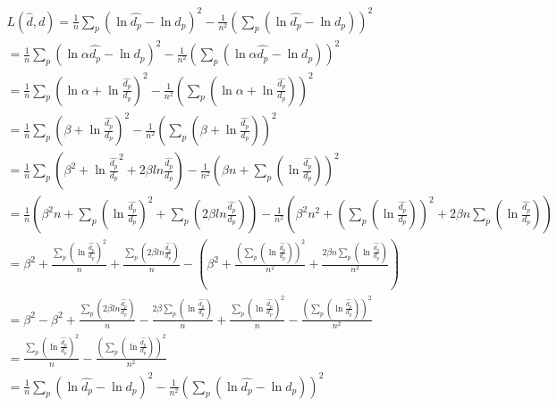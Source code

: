 \label{demostracion}


\begin{align*}
    L(\hat{d}, d) = \frac{1}{n}\sum_{p} (\ln{\hat{d_p}} - \ln{d_p})^2 - \frac{1}{n^2} \left( \sum_{p} (\ln{\hat{d_p}} - \ln{d_p}) \right)^2 \\
    = \frac{1}{n}\sum_{p} (\ln{\alpha \hat{d_p}} - \ln{d_p})^2 - \frac{1}{n^2} \left( \sum_{p} (\ln{\alpha \hat{d_p}} - \ln{d_p}) \right)^2 \\
    = \frac{1}{n}\sum_{p} (\ln{\alpha} + \ln{\frac{\hat{d_p}}{d_p}})^2 - \frac{1}{n^2} \left( \sum_{p} (\ln{\alpha} + \ln{\frac{\hat{d_p}}{d_p}}) \right)^2 \\
    = \frac{1}{n}\sum_{p} (\beta + \ln{\frac{\hat{d_p}}{d_p}})^2 - \frac{1}{n^2} \left( \sum_{p} (\beta + \ln{\frac{\hat{d_p}}{d_p}}) \right)^2 \\
    = \frac{1}{n}\sum_{p} (\beta^2 + \ln{\frac{\hat{d_p}}{d_p}}^2 + 2 \beta ln{\frac{\hat{d_p}}{d_p}}) - \frac{1}{n^2} \left( \beta n + \sum_{p} (\ln{\frac{\hat{d_p}}{d_p}}) \right)^2 \\
    = \frac{1}{n} (\beta^2 n + \sum_{p}(\ln{\frac{\hat{d_p}}{d_p}})^2 + \sum_{p}(2 \beta ln{\frac{\hat{d_p}}{d_p}})) - \frac{1}{n^2} \left( \beta^2 n^2 + (\sum_{p} (\ln{\frac{\hat{d_p}}{d_p}}))^2 + 2 \beta n \sum_{p} (\ln{\frac{\hat{d_p}}{d_p}}) \right) \\
    = \beta^2 + \frac{\sum_{p}(\ln{\frac{\hat{d_p}}{d_p}})^2}{n} + \frac{\sum_{p}(2 \beta ln{\frac{\hat{d_p}}{d_p}})}{n} - \left( \beta^2 + \frac{(\sum_{p} (\ln{\frac{\hat{d_p}}{d_p}}))^2}{n^2} + \frac{2 \beta n \sum_{p} (\ln{\frac{\hat{d_p}}{d_p}})}{n^2} \right) \\
    = \beta^2 - \beta^2 + \frac{\sum_{p}(2 \beta ln{\frac{\hat{d_p}}{d_p}})}{n} - \frac{2 \beta \sum_{p} (\ln{\frac{\hat{d_p}}{d_p}})}{n} + \frac{\sum_{p}(\ln{\frac{\hat{d_p}}{d_p}})^2}{n} - \frac{(\sum_{p} (\ln{\frac{\hat{d_p}}{d_p}}))^2}{n^2} \\
    = \frac{\sum_{p}(\ln{\frac{\hat{d_p}}{d_p}})^2}{n} - \frac{(\sum_{p} (\ln{\frac{\hat{d_p}}{d_p}}))^2}{n^2} \\
    = \frac{1}{n}\sum_{p} (\ln{\hat{d_p}} - \ln{d_p})^2 - \frac{1}{n^2} \left( \sum_{p} (\ln{\hat{d_p}} - \ln{d_p}) \right)^2 \\
\end{align*}